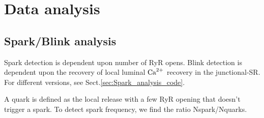 \chapter{Data analysis}

\section{Spark/Blink analysis}
\label{sec:spark-analysis}

Spark detection is dependent upon number of RyR opens. Blink detection
is dependent upon the recovery of local luminal ${\text{Ca}^{2+}}$ recovery in the
junctional-SR. For different versions, see Sect.\ref{sec:Spark_analysis_code}.

A quark is defined as the local release with a few RyR opening that
doesn't trigger a spark. To detect spark frequency, we find the ratio 
Nspark/Nquarks.

